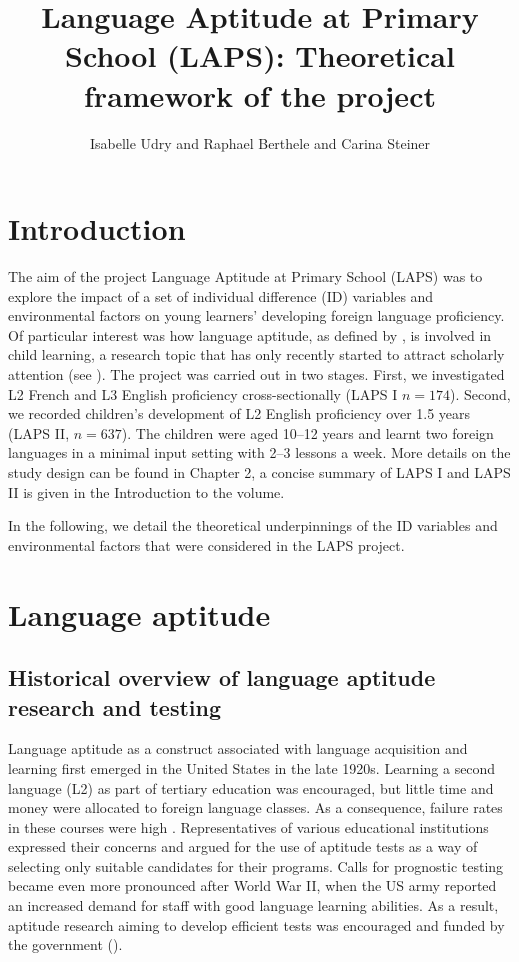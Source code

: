 \documentclass[output=paper]{langscibook}
\author{Isabelle Udry\orcid{}\affiliation{University of Fribourg, Institut de Plurilinguisme; Zurich University of Teacher Education} and Raphael Berthele\orcid{}\affiliation{University of Fribourg, Institut de Plurilinguisme} and Carina Steiner\orcid{}\affiliation{University of Bern, Center for the Study of Language and Society}}
\title[Theoretical framework of the LAPS project]
      {Language Aptitude at Primary School (LAPS): 
      Theoretical framework of the project }
\begin{document}
\maketitle 

\section{Introduction}

The aim of the project Language Aptitude at Primary School (LAPS) was to explore the impact of a set of individual difference (ID) variables and environmental factors on young learners’ developing foreign language proficiency. Of particular interest was how language aptitude, as defined by \citet{Carroll1958}, is involved in child learning, a research topic that has only recently started to attract scholarly attention (see ). The project was carried out in two stages. First, we investigated L2 French and L3 English proficiency cross-sectionally (LAPS I $n=174$). Second, we recorded children’s development of L2 English proficiency over 1.5 years (LAPS II, $n=637$). The children were aged 10--12 years and learnt two foreign languages in a minimal input setting with 2--3 lessons a week. More details on the study design can be found in Chapter 2, a concise summary of LAPS I and LAPS II is given in the Introduction to the volume. 

In the following, we detail the theoretical underpinnings of the ID variables and environmental factors that were considered in the LAPS project. 

\section{Language aptitude}\label{sec:01:2}
\subsection{Historical overview of language aptitude research and testing}\label{sec:01:2.1} %

Language aptitude as a construct associated with language acquisition and learning first emerged in the United States in the late 1920s. Learning a second language (L2) as part of tertiary education was encouraged, but little time and money were allocated to foreign language classes. As a consequence, failure rates in these courses were high \citep{Spolsky1995}. Representatives of various educational institutions expressed their concerns and argued for the use of aptitude tests as a way of selecting only suitable candidates for their programs. Calls for prognostic testing became even more pronounced after World War II, when the US army reported an increased demand for staff with good language learning abilities. As a result, aptitude research aiming to develop efficient tests was encouraged and funded by the government (\citealt{StansfieldReed2004}). 
\end{document}
